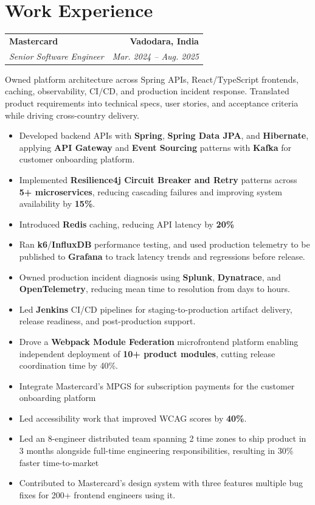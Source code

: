 \documentclass[a4paper,10pt]{article}
\makeatletter
\newcommand{\resumeItem}[1]{\item\small{#1}}
\newcommand{\resumeSubheading}[4]{%
  \vspace{1pt}
  \begin{tabular*}{\textwidth}[t]{l@{\extracolsep{\fill}}r}
    \textbf{#1} & \textbf{\small #2} \\
    \textit{\small #3} & \textit{\small #4} \\
  \end{tabular*}\vspace{-2pt}
}
\newcommand{\resumeRoleSummary}[1]{{\small #1\par}\vspace{-1pt}}
\newcommand{\resumeItemListStart}{\begin{itemize}}
\newcommand{\resumeItemListEnd}{\end{itemize}\vspace{-1pt}}
\makeatother
\begin{document}
\section{Work Experience}
\resumeSubheading
  {Mastercard}{Vadodara, India}
  {Senior Software Engineer}{Mar. 2024 -- Aug. 2025}
\resumeRoleSummary{Owned platform architecture across Spring APIs, React/TypeScript frontends, caching, observability, CI/CD, and production incident response. Translated product requirements into technical specs, user stories, and acceptance criteria while driving cross-country delivery.}
\resumeItemListStart
  \resumeItem{Developed backend APIs with \textbf{Spring}, \textbf{Spring Data JPA}, and \textbf{Hibernate}, applying \textbf{API Gateway} and \textbf{Event Sourcing} patterns with \textbf{Kafka} for customer onboarding platform.}
  \resumeItem{Implemented \textbf{Resilience4j Circuit Breaker and Retry} patterns across \textbf{5+ microservices}, reducing cascading failures and improving system availability by \textbf{15\%}.}
  \resumeItem{Introduced \textbf{Redis} caching, reducing API latency by \textbf{20\%}}
  \resumeItem{Ran \textbf{k6}/\textbf{InfluxDB} performance testing, and used production telemetry to be published to \textbf{Grafana} to track latency trends and regressions before release.}
  \resumeItem{Owned production incident diagnosis using \textbf{Splunk}, \textbf{Dynatrace}, and \textbf{OpenTelemetry}, reducing mean time to resolution from days to hours.}
  \resumeItem{Led \textbf{Jenkins} CI/CD pipelines for staging-to-production artifact delivery, release readiness, and post-production support.}
  \resumeItem{Drove a \textbf{Webpack Module Federation} microfrontend platform enabling independent deployment of \textbf{10+ product modules}, cutting release coordination time by 40\%.}
  \resumeItem{Integrate Mastercard's MPGS for subscription payments for the customer onboarding platform}
  
  \resumeItem{Led accessibility work that improved WCAG scores by \textbf{40\%}.}
  \resumeItem{Led an 8-engineer distributed team spanning 2 time zones to ship product in 3 months alongside full-time engineering responsibilities, resulting in 30\% faster time-to-market}
  \resumeItem{Contributed to Mastercard's design system with three features multiple bug fixes for 200+ frontend engineers using it.}
\resumeItemListEnd
\end{document}
